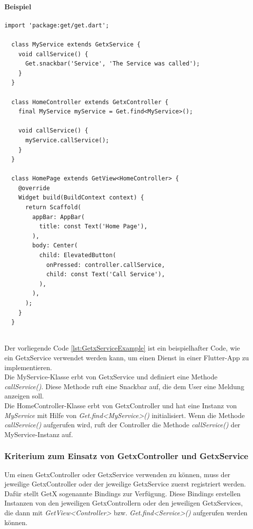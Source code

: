 \paragraph{Beispiel}
\begin{lstlisting}[caption=Beispiel zum Einsatz von einem GetxService,label=lst:GetxServiceExample]
  import 'package:get/get.dart';

  class MyService extends GetxService {
    void callService() {
      Get.snackbar('Service', 'The Service was called');
    }
  }

  class HomeController extends GetxController {
    final MyService myService = Get.find<MyService>();
  
    void callService() {
      myService.callService();
    }
  }
  
  class HomePage extends GetView<HomeController> {
    @override
    Widget build(BuildContext context) {
      return Scaffold(
        appBar: AppBar(
          title: const Text('Home Page'),
        ),
        body: Center(
          child: ElevatedButton(
            onPressed: controller.callService,
            child: const Text('Call Service'),
          ),
        ),
      );
    }
  }
  
\end{lstlisting}
Der vorliegende Code \ref{lst:GetxServiceExample} ist ein beispielhafter Code, wie ein GetxService verwendet werden kann, um einen Dienst in einer Flutter-App zu implementieren.
\\
Die MyService-Klasse erbt von GetxService und definiert eine Methode \textit{callService()}. Diese Methode ruft eine Snackbar auf, die dem User eine Meldung anzeigen soll.
\\
Die HomeController-Klasse erbt von GetxController und hat eine Instanz von \textit{MyService} mit Hilfe von \textit{Get.find<MyService>()} initialisiert. Wenn die Methode \textit{callService()} aufgerufen wird, ruft der Controller die Methode \textit{callService()} der MyService-Instanz auf.

\subsubsection{Kriterium zum Einsatz von GetxController und GetxService}
Um einen GetxController oder GetxService verwenden zu können, muss der jeweilige GetxController oder der jeweilige GetxService zuerst registriert werden. Dafür stellt GetX sogenannte Bindings zur Verfügung. Diese Bindings erstellen Instanzen von den jeweiligen GetxControllern oder den jeweiligen GetxServices, die dann mit \textit{GetView<Controller>} bzw. \textit{Get.find<Service>()} aufgerufen werden können.

